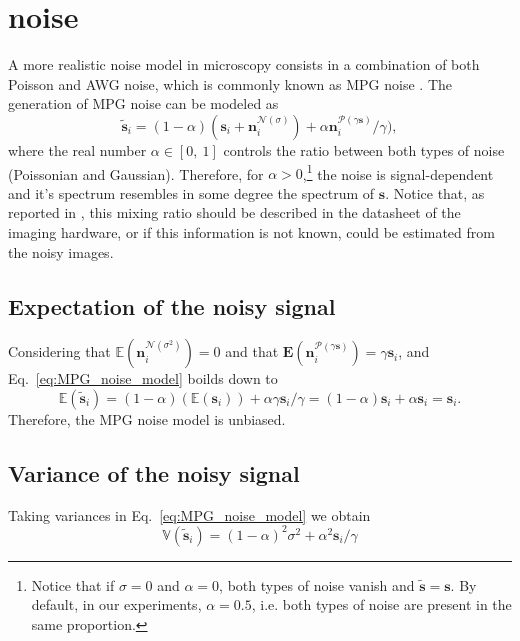 \section{ noise}
\label{sec:MPG}

A more realistic noise model in microscopy consists in a combination
of both Poisson and \gls{AWG} noise, which is commonly known as
\acrshort{MPG} noise \cite{meiniel2018denoising}. The generation of
\gls{MPG} noise can be modeled as
\begin{equation}
  \tilde{\mathbf{s}}_i = (1-\alpha)(\mathbf{s}_i + \mathbf{n}^{\mathcal{N}(\sigma)}_i) + \alpha\mathbf{n}^{\mathcal{P}(\gamma\mathbf{s})}_i/\gamma),
  \label{eq:MPG_noise_model} 
\end{equation}
where the real number $\alpha\in[0,~1]$ controls the ratio between
both types of noise (Poissonian and Gaussian). Therefore, for
$\alpha > 0$,\footnote{Notice that if $\sigma=0$ and $\alpha=0$, both
  types of noise vanish and $\tilde{\mathbf{s}}=\mathbf{s}$. By default,
  in our experiments, $\alpha=0.5$, i.e. both types of noise are
  present in the same proportion.} the noise is signal-dependent and
it's spectrum resembles in some degree the spectrum of
$\mathbf{s}$. Notice that, as reported in \cite{foi2008practical},
this mixing ratio should be described in the datasheet of the imaging
hardware, or if this information is not known, could be estimated from
the noisy images.

\subsection{Expectation of the noisy signal}
Considering that $\mathbb{E}(\mathbf{n}^{\mathcal{N}(\sigma^2)}_i)=0$
and that
$\mathbf{E}(\mathbf{n}^{\mathcal{P}(\gamma\mathbf{s})}_i)=\gamma\mathbf{s}_i$, and Eq.~\ref{eq:MPG_noise_model} boilds down to
\begin{equation}
  \mathbb{E}(\tilde{\mathbf{s}}_i) = (1-\alpha)(\mathbb{E}(\mathbf{s}_i)) + \alpha\gamma\mathbf{s}_i/\gamma = (1-\alpha)\mathbf{s}_i + \alpha\mathbf{s}_i = \mathbf{s}_i.
  \label{eq:E_MPG}
\end{equation}
Therefore, the \gls{MPG} noise model is unbiased.

\subsection{Variance of the noisy signal}
Taking variances in Eq.~\ref{eq:MPG_noise_model} we obtain
\begin{equation}
  \mathbb{V}(\tilde{\mathbf{s}}_i) = (1-\alpha)^2\sigma^2 + \alpha^2\mathbf{s}_i/\gamma
  \label{eq:V_MPG}
\end{equation}


